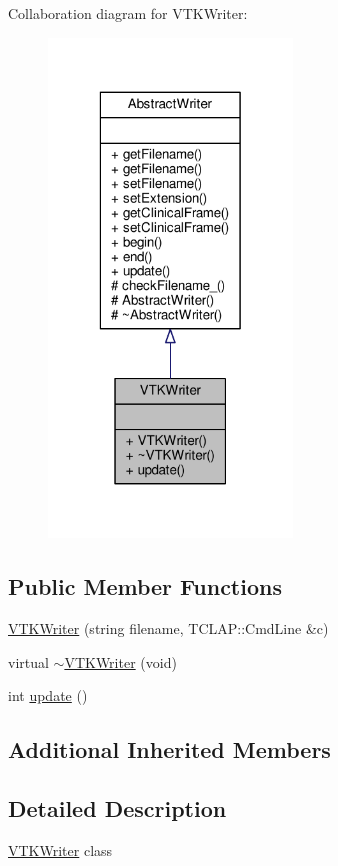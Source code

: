 Collaboration diagram for V\-T\-K\-Writer\-:
\nopagebreak
\begin{figure}[H]
\begin{center}
\leavevmode
\includegraphics[width=184pt]{classVTKWriter__coll__graph}
\end{center}
\end{figure}
\subsection*{Public Member Functions}
\begin{DoxyCompactItemize}
\item 
\hyperlink{classVTKWriter_a5dc5c66ce133cee517c90552d5a5f9c4}{V\-T\-K\-Writer} (string filename, T\-C\-L\-A\-P\-::\-Cmd\-Line \&c)
\item 
virtual \hyperlink{classVTKWriter_afe21ea45991aadd03d20dbd94e167839}{$\sim$\-V\-T\-K\-Writer} (void)
\item 
int \hyperlink{classVTKWriter_abb335d732c6dceac1a389e118e7afb6c}{update} ()
\end{DoxyCompactItemize}
\subsection*{Additional Inherited Members}


\subsection{Detailed Description}
\hyperlink{classVTKWriter}{V\-T\-K\-Writer} class 

